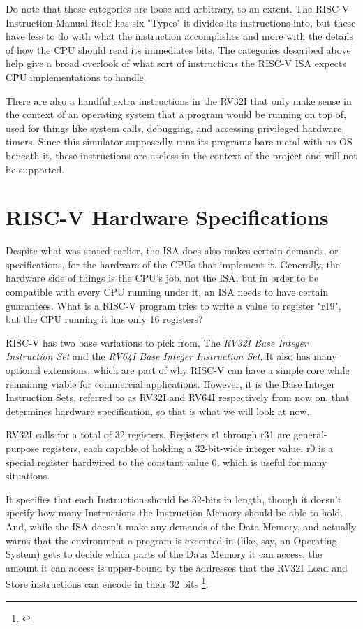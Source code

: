 \documentclass[12pt,twoside]{reedthesis}
\begin{document}
Do note that these categories are loose and arbitrary, to an extent. The RISC-V Instruction Manual itself has six "Types" it divides its instructions into, but these have less to do with what the instruction accomplishes and more with the details of how the CPU should read its immediates bits. The categories described above help give a broad overlook of what sort of instructions the RISC-V ISA expects CPU implementations to handle.

There are also a handful extra instructions in the RV32I that only make sense in the context of an operating system that a program would be running on top of, used for things like system calls, debugging, and accessing privileged hardware timers. Since this simulator supposedly runs its programs bare-metal with no OS beneath it, these instructions are useless in the context of the project and will not be supported.

\section{RISC-V Hardware Specifications}

Despite what was stated earlier, the ISA  does also makes certain demands, or specifications, for the hardware of the CPUs that implement it. Generally, the hardware side of things is the CPU's job, not the ISA; but in order to be compatible with every CPU running under it, an ISA needs to have certain guarantees. What is a RISC-V program tries to write a value to register "r19", but the CPU running it has only 16 registers?

RISC-V has two base variations to pick from, The \textit{RV32I Base Integer Instruction Set} and the \textit{RV64I Base Integer Instruction Set}. It also has many optional extensions, which are part of why RISC-V can have a simple core while remaining viable for commercial applications. However, it is the Base Integer Instruction Sets, referred to as RV32I and RV64I respectively from now on, that determines hardware specification, so that is what we will look at now.

RV32I calls for a total of 32 registers. Registers r1 through r31 are general-purpose registers, each capable of holding a 32-bit-wide integer value. r0 is a special register hardwired to the constant value 0, which is useful for many situations.

It specifies that each Instruction should be 32-bits in length, though it doesn't specify how many Instructions the Instruction Memory should be able to hold. And, while the ISA doesn't make any demands of the Data Memory, and actually warns that the environment a program is executed in (like, say, an Operating System) gets to decide which parts of the Data Memory it can access, the amount it can access is upper-bound by the addresses that the RV32I Load and Store instructions can encode in their 32 bits \footnote{\cite{waterman}}.
\end{document}

